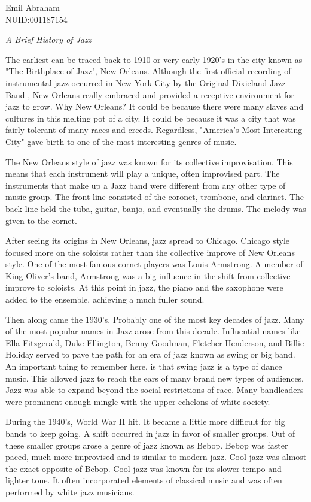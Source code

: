 \documentclass[12pt]{article}
\begin{document}
 \noindent Emil Abraham\\ NUID:001187154\\

\centerline{\emph{A Brief History of Jazz}}

\doublespacing The earliest can be traced back to 1910 or very early 1920's in
the city known as "The Birthplace of Jazz", New Orleans. Although the first
official recording of instrumental jazz occurred in New York City by the
Original Dixieland Jazz Band , New Orleans really embraced and provided a
receptive environment for jazz to grow. Why New Orleans? It could be because
there were many slaves and cultures in this melting pot of a city. It could be
because it was a city that was fairly tolerant of many races and creeds.
Regardless, "America's Most Interesting City" gave birth to one of the most
interesting genres of music.

The New Orleans style of jazz was known for its collective improvisation. This
means that each instrument will play a unique, often improvised part. The
instruments that make up a Jazz band were different from any other type of music
group. The front-line consisted of the coronet, trombone, and clarinet.  The
back-line held the tuba, guitar, banjo, and eventually the drums. The melody was
given to the cornet.

After seeing its origins in New Orleans, jazz spread to Chicago. Chicago style
focused more on the soloists rather than the collective improve of New Orleans
style. One of the most famous cornet players was Louis Armstrong. A member of
King Oliver's band, Armstrong was a big influence in the shift from collective
improve to soloists. At this point in jazz, the piano and the saxophone were
added to the ensemble, achieving a much fuller sound.

Then along came the 1930's. Probably one of the most key decades of jazz. Many
of the most popular names in Jazz arose from this decade. Influential names like
Ella Fitzgerald, Duke Ellington, Benny Goodman, Fletcher Henderson, and Billie
Holiday served to pave the path for an era of jazz known as swing or big band.
An important thing to remember here, is that swing jazz is a type of dance
music. This allowed jazz to reach the ears of many brand new types of audiences.
Jazz was able to expand beyond the social restrictions of race. Many bandleaders
were prominent enough mingle with the upper echelons of white society.

During the 1940's, World War II hit. It became a little more difficult for big
bands to keep going. A shift occurred in jazz in favor of smaller groups. Out of
these smaller groups arose a genre of jazz known as Bebop. Bebop was faster
paced, much more improvised and is similar to modern jazz. Cool jazz was almost
the exact opposite of Bebop. Cool jazz was known for its slower tempo and
lighter tone. It often incorporated elements of classical music and was often
performed by white jazz musicians.
\end{document}
